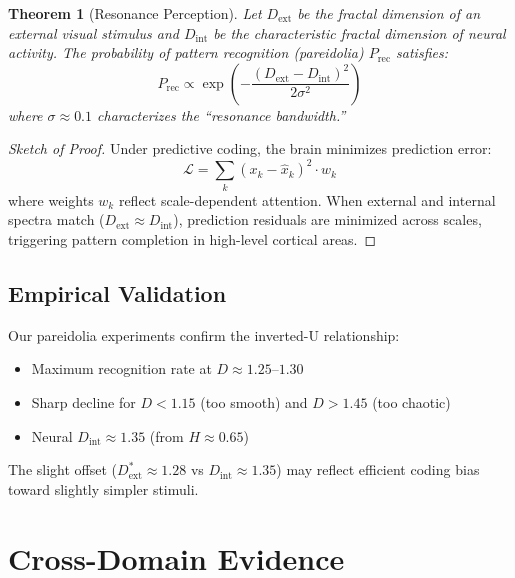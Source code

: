 \documentclass[11pt,a4paper]{article}
\newtheorem{theorem}{Theorem}
\begin{document}
\begin{theorem}[Resonance Perception]
\label{thm:resonance}
Let $D_{\text{ext}}$ be the fractal dimension of an external visual stimulus and $D_{\text{int}}$ be the characteristic fractal dimension of neural activity. The probability of pattern recognition (pareidolia) $P_{\text{rec}}$ satisfies:
\begin{equation}
\boxed{P_{\text{rec}} \propto \exp\left(-\frac{(D_{\text{ext}} - D_{\text{int}})^2}{2\sigma^2}\right)}
\end{equation}
where $\sigma \approx 0.1$ characterizes the ``resonance bandwidth.''
\end{theorem}

\begin{proof}[Sketch of Proof]
Under predictive coding, the brain minimizes prediction error:
\begin{equation}
\mathcal{L} = \sum_k (x_k - \hat{x}_k)^2 \cdot w_k
\end{equation}
where weights $w_k$ reflect scale-dependent attention. When external and internal spectra match ($D_{\text{ext}} \approx D_{\text{int}}$), prediction residuals are minimized across scales, triggering pattern completion in high-level cortical areas.
\end{proof}

\subsection{Empirical Validation}

Our pareidolia experiments confirm the inverted-U relationship:
\begin{itemize}
    \item Maximum recognition rate at $D \approx 1.25$--$1.30$
    \item Sharp decline for $D < 1.15$ (too smooth) and $D > 1.45$ (too chaotic)
    \item Neural $D_{\text{int}} \approx 1.35$ (from $H \approx 0.65$)
\end{itemize}

The slight offset ($D_{\text{ext}}^* \approx 1.28$ vs $D_{\text{int}} \approx 1.35$) may reflect efficient coding bias toward slightly simpler stimuli.

\section{Cross-Domain Evidence}
\end{document}

